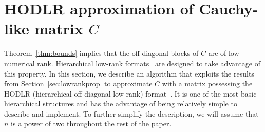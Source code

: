 \documentclass[final,reqno,onefignum,onetabnum]{siamart190516}
\begin{document}
\section{HODLR approximation of Cauchy-like matrix $C$}
\label{sec:HODLR}


Theorem~\ref{thm:bounds} implies that the off-diagonal blocks of $C$ are of low numerical rank. 
Hierarchical low-rank formats~\cite{hackbusch2015hierarchical} are designed to take advantage of this property. In this section, we describe an algorithm that exploits the results from Section~\ref{sec:lowrankprop} 
to approximate $C$ with a matrix possessing the HODLR (hierarchical off-diagonal low rank) format~\cite{martinsson2011fast}. It is one of the most basic hierarchical structures and has the advantage of being relatively simple to describe and implement. %
To further simplify the description, we will assume that $n$ is a power of two throughout the rest of the paper.
\end{document}
